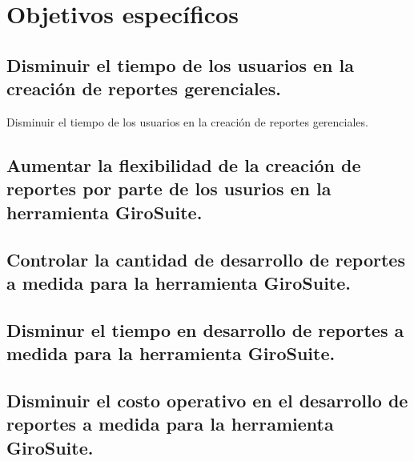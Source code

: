 \section{Objetivos espec\'{i}ficos}
\begin{spacing}{1.5}
	\subsection{Disminuir el tiempo de los usuarios en la creaci\'{o}n de reportes gerenciales.}
	Disminuir el tiempo de los usuarios en la creaci\'{o}n de reportes gerenciales.
	\subsection{Aumentar la flexibilidad de la creaci\'{o}n de reportes por parte de los usurios en la herramienta GiroSuite.}
	\subsection{Controlar la cantidad de desarrollo de reportes a medida para la herramienta GiroSuite.}
	\subsection{Disminur el tiempo en desarrollo de reportes a medida para la herramienta GiroSuite.}
	\subsection{Disminuir el costo operativo en el desarrollo de reportes a medida para la herramienta GiroSuite.}
\end{spacing}


	
